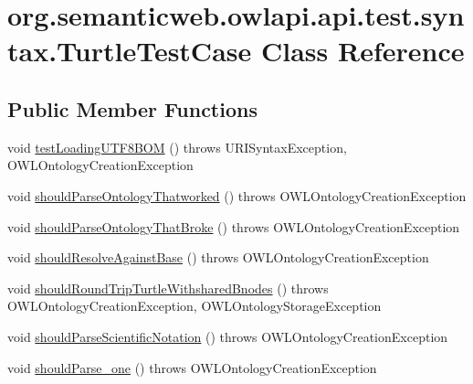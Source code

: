 \hypertarget{classorg_1_1semanticweb_1_1owlapi_1_1api_1_1test_1_1syntax_1_1_turtle_test_case}{\section{org.\-semanticweb.\-owlapi.\-api.\-test.\-syntax.\-Turtle\-Test\-Case Class Reference}
\label{classorg_1_1semanticweb_1_1owlapi_1_1api_1_1test_1_1syntax_1_1_turtle_test_case}
}
\subsection*{Public Member Functions}
\begin{DoxyCompactItemize}
\item 
void \hyperlink{classorg_1_1semanticweb_1_1owlapi_1_1api_1_1test_1_1syntax_1_1_turtle_test_case_a003279d42e6f446c10661fc15244a7b7}{test\-Loading\-U\-T\-F8\-B\-O\-M} ()  throws U\-R\-I\-Syntax\-Exception,             O\-W\-L\-Ontology\-Creation\-Exception 
\item 
void \hyperlink{classorg_1_1semanticweb_1_1owlapi_1_1api_1_1test_1_1syntax_1_1_turtle_test_case_aaadc2bb33760ee0446959c9465a30b79}{should\-Parse\-Ontology\-Thatworked} ()  throws O\-W\-L\-Ontology\-Creation\-Exception 
\item 
void \hyperlink{classorg_1_1semanticweb_1_1owlapi_1_1api_1_1test_1_1syntax_1_1_turtle_test_case_abf166395c726c52efee126a3bcf44ba0}{should\-Parse\-Ontology\-That\-Broke} ()  throws O\-W\-L\-Ontology\-Creation\-Exception 
\item 
void \hyperlink{classorg_1_1semanticweb_1_1owlapi_1_1api_1_1test_1_1syntax_1_1_turtle_test_case_ac4a715ee8264c94182e8a795d9e5cabe}{should\-Resolve\-Against\-Base} ()  throws O\-W\-L\-Ontology\-Creation\-Exception 
\item 
void \hyperlink{classorg_1_1semanticweb_1_1owlapi_1_1api_1_1test_1_1syntax_1_1_turtle_test_case_a295942c28f1e767edc8f06b4f48ab90f}{should\-Round\-Trip\-Turtle\-Withshared\-Bnodes} ()  throws O\-W\-L\-Ontology\-Creation\-Exception, O\-W\-L\-Ontology\-Storage\-Exception 
\item 
void \hyperlink{classorg_1_1semanticweb_1_1owlapi_1_1api_1_1test_1_1syntax_1_1_turtle_test_case_a1673feeb4647325c1fd788b1dce78fe6}{should\-Parse\-Scientific\-Notation} ()  throws O\-W\-L\-Ontology\-Creation\-Exception 
\item 
void \hyperlink{classorg_1_1semanticweb_1_1owlapi_1_1api_1_1test_1_1syntax_1_1_turtle_test_case_a079eb70ae678adbf0d93b12c57803539}{should\-Parse\-\_\-one} ()  throws O\-W\-L\-Ontology\-Creation\-Exception 

\end{DoxyCompactItemize}
